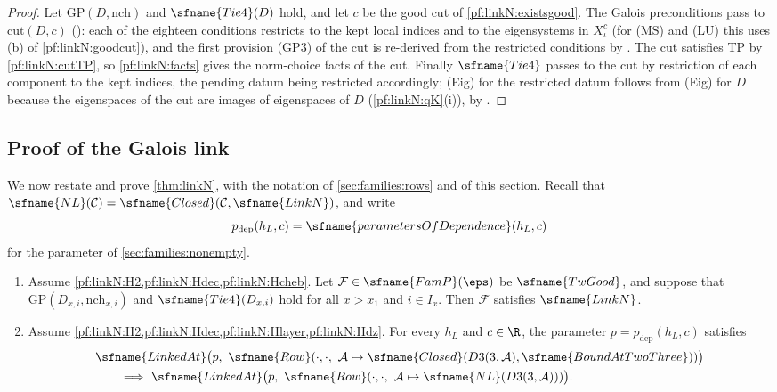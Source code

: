\begin{proof}
Let $\mathrm{GP}(D,\mathrm{nch})$ and $\sfname{Tie4}(D)$ hold, and let $c$ be the good cut of \cref{pf:linkN:existsgood}. The Galois
preconditions pass to $\mathrm{cut}(D,c)$ (): each of the eighteen conditions restricts to
the kept local indices and to the eigensystems in $X^c_\iota$ (for (MS) and (LU) this uses (b) of \cref{pf:linkN:goodcut}), and the
first provision (GP3) of the cut is re-derived from the restricted conditions by .
The cut satisfies $\mathrm{TP}$ by \cref{pf:linkN:cutTP}, so \cref{pf:linkN:facts} gives the norm-choice facts of the cut. Finally $\sfname{Tie4}$ passes to the cut by restriction of each component to the kept indices, the pending datum being
restricted accordingly; (Eig) for the restricted datum follows from (Eig) for $D$ because the eigenspaces of the cut are images of
eigenspaces of $D$ (\cref{pf:linkN:qK}(i)), by .
\end{proof}

\subsection{Proof of the Galois link}\label{sec:pf:linkN:b}

We now restate and prove \cref{thm:linkN}, with the notation of \cref{sec:families:rows} and of this section. Recall that
$\sfname{NL}(\mathcal C)=\sfname{Closed}(\mathcal C,\sfname{LinkN})$, and write
\[
p_{\mathrm{dep}}(h_L,c)=\sfname{parametersOfDependence}(h_L,c)
\]
for the parameter of \cref{sec:families:nonempty}.

\begin{theorem}\label{pf:linkN:main}
\begin{enumerate}[label=(\alph*)]
\item Assume \cref{pf:linkN:H2,pf:linkN:Hdec,pf:linkN:Hcheb}. Let $\mathcal F\in\sfname{FamP}(\eps)$ be $\sfname{TwGood}$, and suppose
that $\mathrm{GP}(D_{x,i},\mathrm{nch}_{x,i})$ and $\sfname{Tie4}(D_{x,i})$ hold for all $x>x_1$ and $i\in I_x$. Then $\mathcal F$
satisfies $\sfname{LinkN}$.
\item Assume \cref{pf:linkN:H2,pf:linkN:Hdec,pf:linkN:Hlayer,pf:linkN:Hdz}. For every $h_L$ and $c\in\R$, the parameter
$p=p_{\mathrm{dep}}(h_L,c)$ satisfies
\[
\begin{aligned}
&\sfname{LinkedAt}\bigl(p,\ \sfname{Row}(\cdot,\cdot,\ \mathcal A\mapsto\sfname{Closed}(D3(3,\mathcal A),\sfname{BoundAtTwoThree}))\bigr)\\
&\qquad\Longrightarrow\ \sfname{LinkedAt}\bigl(p,\ \sfname{Row}(\cdot,\cdot,\ \mathcal A\mapsto\sfname{NL}(D3(3,\mathcal A)))\bigr).
\end{aligned}
\]
\end{enumerate}
\end{theorem}

